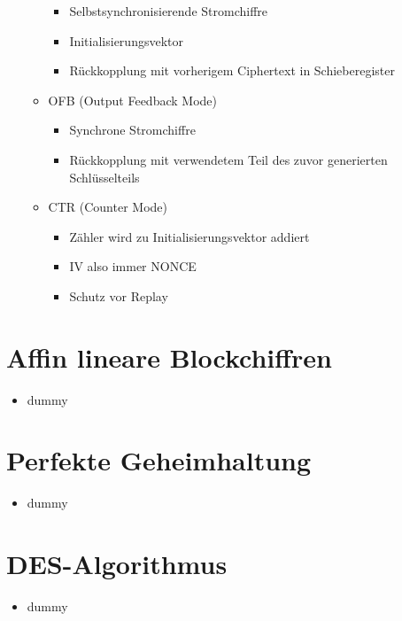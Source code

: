 \documentclass[11pt, paper=a4, twocolumn]{scrartcl}
\begin{document}
\begin{itemize}
\begin{itemize}
						\begin{itemize}
							\item Selbstsynchronisierende Stromchiffre
							\item Initialisierungsvektor
							\item Rückkopplung mit vorherigem Ciphertext in Schieberegister
						\end{itemize}
					\item OFB (Output Feedback Mode)
						\begin{itemize}
							\item Synchrone Stromchiffre
							\item Rückkopplung mit verwendetem Teil des zuvor generierten Schlüsselteils
						\end{itemize}
					\item CTR (Counter Mode)
						\begin{itemize}
							\item Zähler wird zu Initialisierungsvektor addiert
							\item IV also immer NONCE
							\item Schutz vor Replay
						\end{itemize}
				\end{itemize}
		\end{itemize}
	
	\section{Affin lineare Blockchiffren}
		\begin{itemize}
			\item dummy
		\end{itemize}
	
	\section{Perfekte Geheimhaltung}
		\begin{itemize}
			\item dummy
		\end{itemize}
	
	\section{DES-Algorithmus}
		\begin{itemize}
			\item dummy
		\end{itemize}
	
\end{document}
